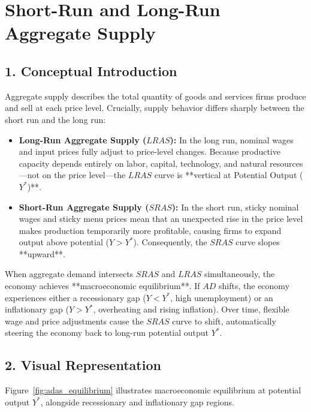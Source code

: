 \documentclass[11pt,letterpaper]{article}
\begin{document}
\section{Short-Run and Long-Run Aggregate Supply}

\subsection*{1. Conceptual Introduction}
Aggregate supply describes the total quantity of goods and services firms produce and sell at each price level. Crucially, supply behavior differs sharply between the short run and the long run:
\begin{itemize}
    \item \textbf{Long-Run Aggregate Supply ($LRAS$):} In the long run, nominal wages and input prices fully adjust to price-level changes. Because productive capacity depends entirely on labor, capital, technology, and natural resources—not on the price level—the $LRAS$ curve is **vertical at Potential Output ($Y^*$)**.
    \item \textbf{Short-Run Aggregate Supply ($SRAS$):} In the short run, sticky nominal wages and sticky menu prices mean that an unexpected rise in the price level makes production temporarily more profitable, causing firms to expand output above potential ($Y > Y^*$). Consequently, the $SRAS$ curve slopes **upward**.
\end{itemize}

When aggregate demand intersects $SRAS$ and $LRAS$ simultaneously, the economy achieves **macroeconomic equilibrium**. If $AD$ shifts, the economy experiences either a recessionary gap ($Y < Y^*$, high unemployment) or an inflationary gap ($Y > Y^*$, overheating and rising inflation). Over time, flexible wage and price adjustments cause the $SRAS$ curve to shift, automatically steering the economy back to long-run potential output $Y^*$.

\subsection*{2. Visual Representation}
Figure~\ref{fig:adas_equilibrium} illustrates macroeconomic equilibrium at potential output $Y^*$, alongside recessionary and inflationary gap regions.
\end{document}
